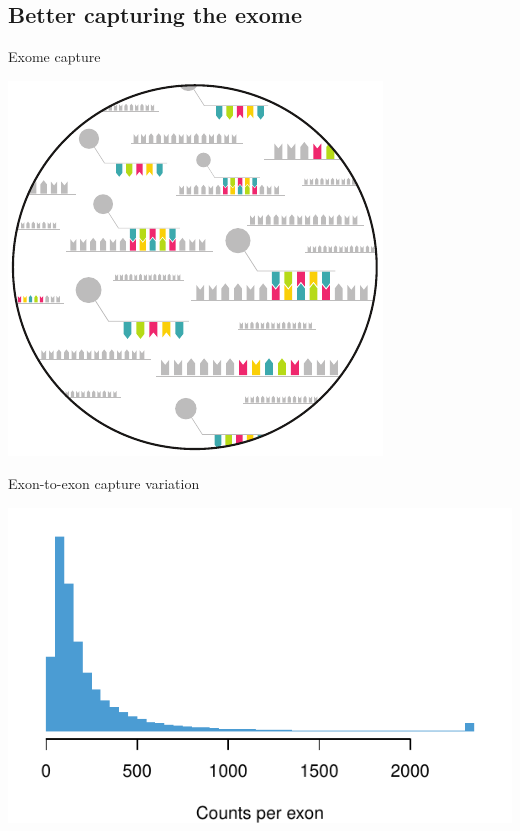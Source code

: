 \documentclass[
  10pt,
  ignorenonframetext,
  m]{beamer}
\begin{document}
\hypertarget{better-capturing-the-exome}{%
\subsection{Better capturing the
exome}\label{better-capturing-the-exome}}

\begin{frame}{Exome capture}
\protect\hypertarget{exome-capture}{}

\centering

\includegraphics{images/captureBubble.pdf}

\end{frame}

\begin{frame}{Exon-to-exon capture variation}
\protect\hypertarget{exon-to-exon-capture-variation}{}

\begin{center}\includegraphics{defense_files/figure-beamer/exonCapVar-1} \end{center}

\end{frame}
\end{document}
